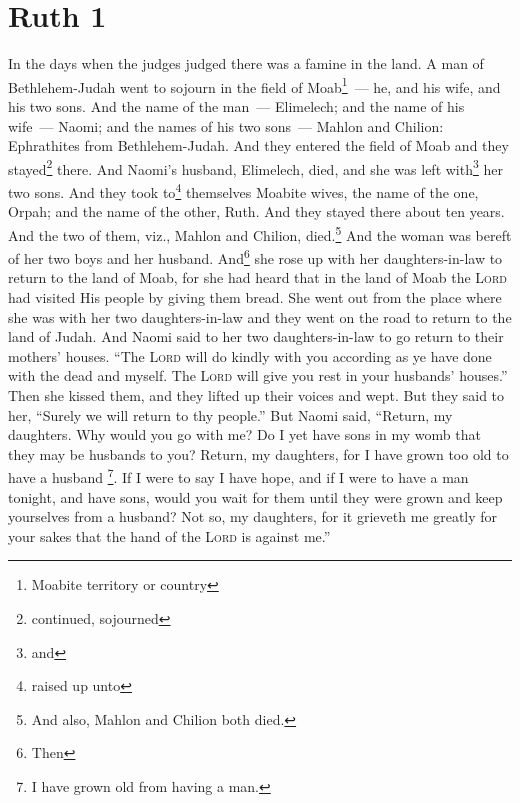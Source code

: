 \section{Ruth 1}\label{Ruth 1}
\begin{enumerate}[align=center]
     In the days when the judges judged there was a famine in the land. A man of Bethlehem-Judah went to sojourn in the field of Moab\footnote{Moabite territory or country}~--- he, and his wife, and his two sons.%
     And the name of the man~--- Elimelech; and the name of his wife~--- Naomi; and the names of his two sons~--- Mahlon and Chilion: Ephrathites from Bethlehem-Judah. And they entered the field of Moab and they stayed\footnote{continued, sojourned} there.%
     And Naomi's husband, Elimelech, died, and she was left with\footnote{and} her two sons.%
     And they took to\footnote{raised up unto} themselves Moabite wives, the name of the one, Orpah; and the name of the other, Ruth. And they stayed there about ten years.%
     And the two of them, viz., Mahlon and Chilion, died.\footnote{ And also, Mahlon and Chilion both died.} And the woman was bereft of her two boys and her husband.%
     And\footnote{Then} she rose up with her daughters-in-law to return to the land of Moab, for she had heard that in the land of Moab the \textsc{Lord} had visited His people by giving them bread.%
     She went out from the place where she was with her two daughters-in-law and they went on the road to return to the land of Judah.%
     And Naomi said to her two daughters-in-law to go return to their mothers' houses. ``The \textsc{Lord} will do kindly with you according as ye have done with the dead and myself.%
     The \textsc{Lord} will give you rest in your husbands' houses.'' Then she kissed them, and they lifted up their voices and wept.%
     But they said to her, ``Surely we will return to thy people.''%
     But Naomi said, ``Return, my daughters. Why would you go with me? Do I yet have sons in my womb that they may be husbands to you?%
     Return, my daughters, for I have grown too old to have a husband \footnote{I have grown old from having a man.}. If I were to say I have hope, and if I were to have a man tonight, and have sons,%
     would you wait for them until they were grown and keep yourselves from a husband? Not so, my daughters, for it grieveth me greatly for your sakes that the hand of the \textsc{Lord} is against me.''%

\end{enumerate}
